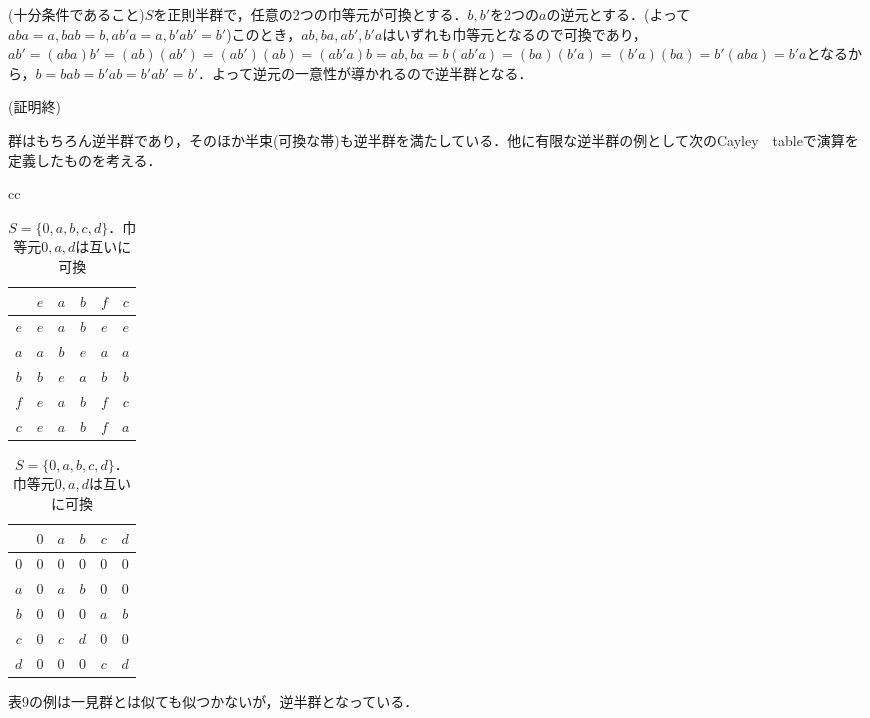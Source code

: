 (十分条件であること)$S$を正則半群で，任意の2つの巾等元が可換とする．$b,b'$を2つの$a$の逆元とする．(よって$aba=a,bab=b,ab'a=a,b'ab'=b'$)このとき，$ab,ba,ab',b'a$はいずれも巾等元となるので可換であり，$ab'=(aba)b'=(ab)(ab')=(ab')(ab)=(ab'a)b=ab,ba=b(ab'a)=(ba)(b'a)=(b'a)(ba)=b'(aba)=b'a$となるから，$b=bab=b'ab=b'ab'=b'$．よって逆元の一意性が導かれるので逆半群となる．
\begin{flushright}
(証明終)
\end{flushright}
群はもちろん逆半群であり，そのほか半束(可換な帯)も逆半群を満たしている．他に有限な逆半群の例として次のCayley　tableで演算を定義したものを考える．
\begin{table}[htbp]
\begin{center}
\begin{tabular}{cc}
\begin{minipage}{0.5\hsize}
\begin{center}
\begin{tabular}{c|ccccc}
     &$e$&$a$&$b$&$f$&$c$ \\ \hline
$e$&$e$&$a$&$b$&$e$&$e$ \\
$a$&$a$&$b$&$e$&$a$&$a$ \\
$b$&$b$&$e$&$a$&$b$&$b$ \\
$f$&$e$&$a$&$b$&$f$&$c$ \\
$c$&$e$&$a$&$b$&$f$&$a$
\end{tabular}
\caption{$S=\{e,a,b,f,c\}$は2つの群$S_1=\{e,a,b\},S_2=\{f,c\}$の和集合であり，巾等元$e,f$は可換}
\end{center}
\end{minipage}
\begin{minipage}{0.5\hsize}
\begin{center}
\begin{tabular}{c|ccccc}
     &$0$&$a$&$b$&$c$&$d$ \\ \hline
$0$&$0$&$0$&$0$&$0$&$0$ \\
$a$&$0$&$a$&$b$&$0$&$0$ \\
$b$&$0$&$0$&$0$&$a$&$b$ \\
$c$&$0$&$c$&$d$&$0$&$0$ \\
$d$&$0$&$0$&$0$&$c$&$d$
\end{tabular}
\caption{$S=\{0,a,b,c,d\}$．巾等元$0,a,d$は互いに可換}
\end{center}
\end{minipage}
\end{tabular}
\end{center}
\end{table}
表9の例は一見群とは似ても似つかないが，逆半群となっている．\\
